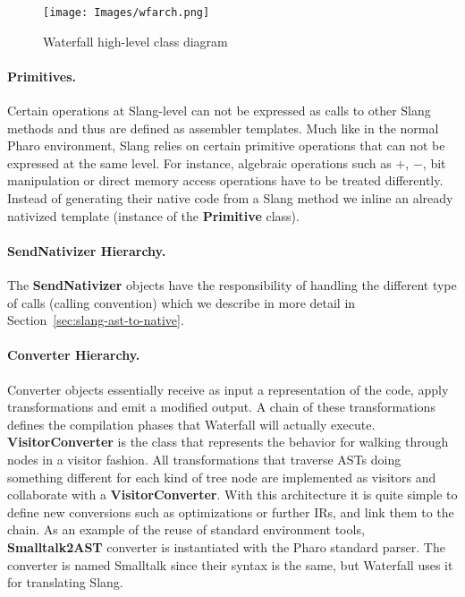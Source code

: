 \documentclass[10pt,preprint,letter]{sigplanconf}
\newcommand{\secref}  [1] {\ref{sec:#1}}
\newcommand{\PH}  {Pharo\xspace}
\newcommand{\W}{Waterfall\xspace}
\begin{document}
\begin{figure}[H]
\begin{center}
	\texttt{[image: Images/wfarch.png]} 
	\caption{\W high-level class diagram}
	\label{fig:classdiag}
\end{center}
\end{figure}


\paragraph{Primitives.}
Certain operations at Slang-level can not be expressed as calls to other Slang methods and thus are defined as assembler templates. Much like in the normal \PH environment, Slang relies on certain primitive operations that can not be expressed at the same level.
For instance, algebraic operations such as $+$, $-$, bit manipulation or direct memory access operations have to be treated differently.
Instead of generating their native code from a Slang method we inline an already nativized template (instance of the \textbf{Primitive} class).

\paragraph{SendNativizer Hierarchy.}
The \textbf{SendNativizer} objects have the responsibility of handling the different type of calls (calling convention) which we describe in more detail in Section~\secref{slang-ast-to-native}.
 
\paragraph{Converter Hierarchy.}
Converter objects essentially receive as input a representation of the code, apply transformations and emit a modified output.
A chain of these transformations defines the compilation phases that \W will actually execute. 
\textbf{VisitorConverter} is the class that represents the behavior for walking through nodes in a visitor fashion. 
All transformations that traverse ASTs doing something different for each kind of tree node are implemented as visitors and collaborate with a \textbf{VisitorConverter}.
With this architecture it is quite simple to define new conversions such as optimizations or further IRs, and link them to the chain.
As an  example of the reuse of standard environment tools, \textbf{Smalltalk2AST} converter is instantiated with the \PH standard parser. The converter is named Smalltalk since their syntax is the same, but \W uses it for translating Slang.
\end{document}
